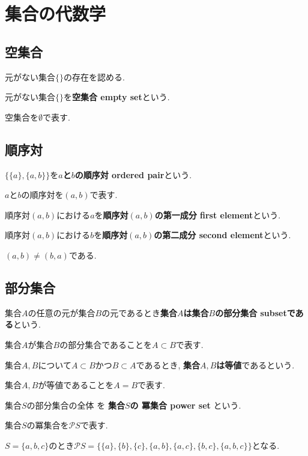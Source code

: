 \section{集合の代数学}
\subsection{空集合}
\begin{caution}
元がない集合$\{\}$の存在を認める.
\end{caution}
\begin{Def}
元がない集合$\{\}$を{\bf 空集合 empty set}という.
\end{Def}
\begin{Notation}
空集合を$\emptyset$で表す.
\end{Notation}
\subsection{順序対}
\begin{Def}
$\{\{a\},\{a,b\}\}$を{\bf $a$と$b$の順序対 ordered pair}という.
\end{Def}
\begin{Notation}
$a$と$b$の順序対を$(a,b)$で表す.
\end{Notation}
\begin{Def}
順序対$(a,b)$における$a$を{\bf 順序対$(a,b)$の第一成分 first element}という.
\end{Def}
\begin{Def}
順序対$(a,b)$における$b$を{\bf 順序対$(a,b)$の第二成分 second element}という.
\end{Def}
\begin{caution}
$(a,b)\neq(b,a)$である.
\end{caution}
\subsection{部分集合}
\begin{Def}
集合$A$の任意の元が集合$B$の元であるとき{\bf 集合$A$は集合$B$の部分集合 subsetである}という.  
\end{Def}
\begin{Notation}
集合$A$が集合$B$の部分集合であることを$A\subset B$で表す.
\end{Notation}
\begin{Def}
集合$A,B$について$A\subset B$かつ$B\subset A$であるとき, {\bf 集合$A,B$は等値}であるという.
\end{Def}
\begin{Notation}
集合$A,B$が等値であることを$A=B$で表す.
\end{Notation}
\begin{Def}
集合$S$の部分集合の全体
を
{\bf 集合$S$の
冪集合 power set}
という.
\end{Def}
\begin{Notation}
集合$S$の冪集合を$\mathcal{P}S$で表す.
\end{Notation}
\begin{example}
$S=\{a,b,c\}$のとき$\mathcal{P} S=\{\{a\},\{b\},\{c\},\{a,b\},\{a,c\},\{b,c\},\{a,b,c\}\}$となる.
\end{example}

